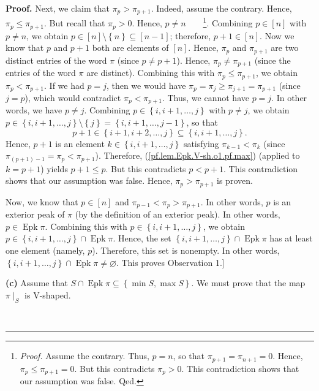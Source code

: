 \documentclass[numbers=enddot,12pt,final,onecolumn,notitlepage]{scrartcl}%
\theoremstyle{definition}
\newenvironment{proof}[1][Proof]{\noindent\textbf{#1.} }{\ \rule{0.5em}{0.5em}}
\newenvironment{verlong}{}{}
\begin{document}
\begin{verlong}
\begin{proof}
Next, we claim that $\pi_{p}>\pi_{p+1}$. Indeed, assume the contrary. Hence,
$\pi_{p}\leq\pi_{p+1}$. But recall that $\pi_{p}>0$. Hence, $p\neq
n$\ \ \ \ \footnote{\textit{Proof.} Assume the contrary. Thus, $p=n$, so that
$\pi_{p+1}=\pi_{n+1}=0$. Hence, $\pi_{p}\leq\pi_{p+1}=0$. But this contradicts
$\pi_{p}>0$. This contradiction shows that our assumption was false. Qed.}.
Combining $p\in\left[  n\right]  $ with $p\neq n$, we obtain $p\in\left[
n\right]  \setminus\left\{  n\right\}  \subseteq\left[  n-1\right]  $;
therefore, $p+1\in\left[  n\right]  $. Now we know that $p$ and $p+1$ both are
elements of $\left[  n\right]  $. Hence, $\pi_{p}$ and $\pi_{p+1}$ are two
distinct entries of the word $\pi$ (since $p\neq p+1$). Hence, $\pi_{p}\neq
\pi_{p+1}$ (since the entries of the word $\pi$ are distinct). Combining this
with $\pi_{p}\leq\pi_{p+1}$, we obtain $\pi_{p}<\pi_{p+1}$. If we had $p=j$,
then we would have $\pi_{p}=\pi_{j}\geq\pi_{j+1}=\pi_{p+1}$ (since $j=p$),
which would contradict $\pi_{p}<\pi_{p+1}$. Thus, we cannot have $p=j$. In
other words, we have $p\neq j$. Combining $p\in\left\{  i,i+1,\ldots
,j\right\}  $ with $p\neq j$, we obtain $p\in\left\{  i,i+1,\ldots,j\right\}
\setminus\left\{  j\right\}  =\left\{  i,i+1,\ldots,j-1\right\}  $, so that
\[
p+1\in\left\{  i+1,i+2,\ldots,j\right\}  \subseteq\left\{  i,i+1,\ldots
,j\right\}  .
\]
Hence, $p+1$ is an element $k\in\left\{  i,i+1,\ldots,j\right\}  $ satisfying
$\pi_{k-1}<\pi_{k}$ (since $\pi_{\left(  p+1\right)  -1}=\pi_{p}<\pi_{p+1}$).
Therefore, (\ref{pf.lem.Epk.V-sh.o1.pf.max}) (applied to $k=p+1$) yields
$p+1\leq p$. But this contradicts $p<p+1$. This contradiction shows that our
assumption was false. Hence, $\pi_{p}>\pi_{p+1}$ is proven.

Now, we know that $p\in\left[  n\right]  $ and $\pi_{p-1}<\pi_{p}>\pi_{p+1}$.
In other words, $p$ is an exterior peak of $\pi$ (by the definition of an
exterior peak). In other words, $p\in\operatorname{Epk}\pi$. Combining this
with $p\in\left\{  i,i+1,\ldots,j\right\}  $, we obtain $p\in\left\{
i,i+1,\ldots,j\right\}  \cap\operatorname{Epk}\pi$. Hence, the set $\left\{
i,i+1,\ldots,j\right\}  \cap\operatorname{Epk}\pi$ has at least one element
(namely, $p$). Therefore, this set is nonempty. In other words, $\left\{
i,i+1,\ldots,j\right\}  \cap\operatorname{Epk}\pi\neq\varnothing$. This
proves Observation 1.]

\textbf{(c)} Assume that $S\cap\operatorname{Epk}\pi\subseteq\left\{  \min
S,\max S\right\}  $. We must prove that the map $\pi\mid_{S}$ is V-shaped.


\end{proof}
\end{verlong}
\end{document}
